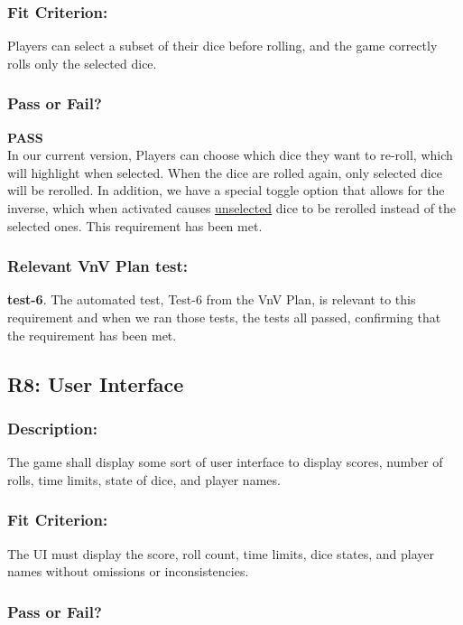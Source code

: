 \documentclass[12pt, titlepage]{article}
\begin{document}
\subsubsection{Fit Criterion:} Players can select a subset of their dice before rolling, and the game correctly rolls only the selected dice.


\subsubsection{Pass or Fail?} 

 \noindent \textbf{PASS}\\
 
 \noindent In our current version, Players can choose which dice they want to re-roll, which will highlight when selected. When the dice are rolled again, only selected dice will be rerolled. In addition, we have a special toggle option that allows for the inverse, which when activated causes \underline{unselected} dice to be rerolled instead of the selected ones. This requirement has been met.

\subsubsection{Relevant VnV Plan test: } \textbf{test-6}.  The automated test, Test-6 from the VnV Plan, is relevant to this requirement and when we ran those tests, the tests all passed, confirming that the requirement has been met.

\subsection{R8: User Interface} 

\subsubsection{Description:}  The game shall display some sort of user interface to display scores, number of rolls, time limits, state of dice, and player names.

\subsubsection{Fit Criterion:} The UI must display the score, roll count, time limits, dice states, and player names without omissions or inconsistencies.

\subsubsection{Pass or Fail?} 
\end{document}
